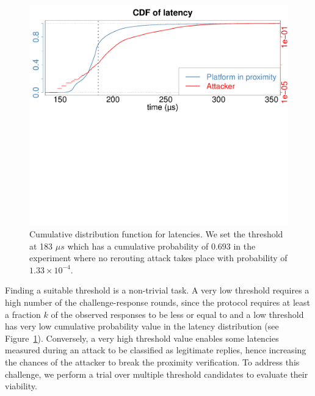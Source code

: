\begin{figure}[t]
  \centering
    \includegraphics[trim={0 15cm 0 0}, clip, width=\linewidth]{data/fx3_data/CDF_N.pdf}
    \caption{Cumulative distribution function for latencies. We set the threshold \connect at 183 $\mu s$ which has a cumulative probability of $0.693$ in the experiment where no rerouting attack takes place with probability of $1.33\times10^{-4}$.}
    \vspace{-10pt}
    \label{fig:cdf}
\end{figure}


 Finding a suitable threshold \connect is a non-trivial task. A very low threshold requires a high number of the challenge-response rounds, since the protocol requires at least a fraction $k$ of the observed responses to be less or equal to \connect and a low threshold has very low cumulative probability value in the latency distribution (see Figure~\ref{fig:cdf}). Conversely, a very high threshold value enables some latencies measured during an attack to be classified as legitimate replies, hence increasing the chances of the attacker to break the proximity verification. To address this challenge, we perform a trial over multiple threshold candidates to evaluate their viability.


